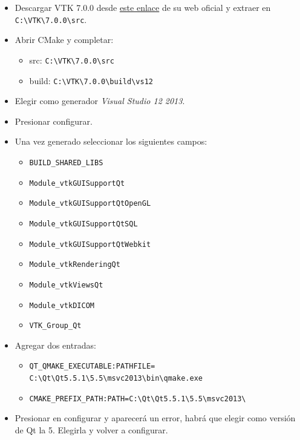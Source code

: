 \begin{itemize}
	\item Descargar VTK 7.0.0 desde \href{http://www.vtk.org/files/release/7.0/VTK-7.0.0.zip}{este enlace} de su web oficial y extraer en \texttt{C:\textbackslash VTK\textbackslash 7.0.0\textbackslash src}.
	\item Abrir CMake y completar:
	\begin{itemize}
		\item src: \texttt{C:\textbackslash VTK\textbackslash 7.0.0\textbackslash src}
		\item build: \texttt{C:\textbackslash VTK\textbackslash 7.0.0\textbackslash build\textbackslash vs12}
	\end{itemize}
	\item Elegir como generador \textit{Visual Studio 12 2013}.
	\item Presionar configurar.
	\item Una vez generado seleccionar los siguientes campos:
	\begin{itemize}
		\item \texttt{BUILD\_SHARED\_LIBS}
		\item \texttt{Module\_vtkGUISupportQt}
		\item \texttt{Module\_vtkGUISupportQtOpenGL}
		\item \texttt{Module\_vtkGUISupportQtSQL}
		\item \texttt{Module\_vtkGUISupportQtWebkit}
		\item \texttt{Module\_vtkRenderingQt}
		\item \texttt{Module\_vtkViewsQt}
		\item \texttt{Module\_vtkDICOM}
		\item \texttt{VTK\_Group\_Qt}
	\end{itemize}
	\item Agregar dos entradas:
	\begin{itemize}
		\item \texttt{QT\_QMAKE\_EXECUTABLE:PATHFILE=\\C:\textbackslash Qt\textbackslash Qt5.5.1\textbackslash 5.5\textbackslash msvc2013\textbackslash bin\textbackslash qmake.exe}
		\item \texttt{CMAKE\_PREFIX\_PATH:PATH=C:\textbackslash Qt\textbackslash Qt5.5.1\textbackslash 5.5\textbackslash msvc2013\textbackslash}
	\end{itemize}
	\item Presionar en configurar y aparecerá un error, habrá que elegir como versión de Qt la 5. Elegirla y volver a configurar.

\end{itemize}
